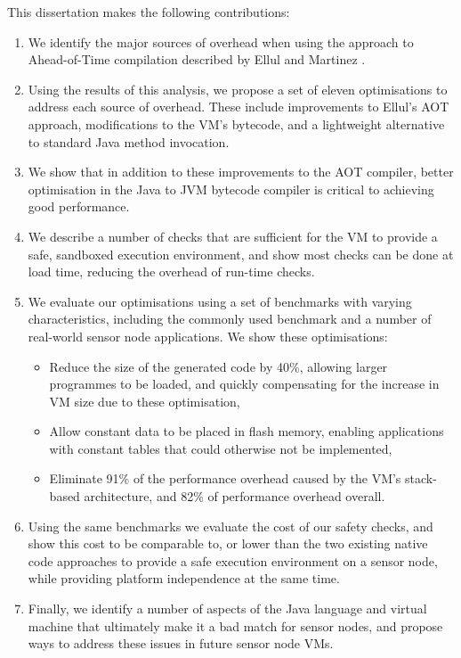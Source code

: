 \noindent
This dissertation makes the following contributions:
\begin{enumerate}
    \item We identify the major sources of overhead when using the approach to Ahead-of-Time compilation described by Ellul and Martinez \cite{Ellul:2010iw, Ellul:2012thesis}.
    \item Using the results of this analysis, we propose a set of eleven optimisations to address each source of overhead. These include improvements to Ellul's AOT approach, modifications to the VM's bytecode, and a lightweight alternative to standard Java method invocation.    
    \item We show that in addition to these improvements to the AOT compiler, better optimisation in the Java to JVM bytecode compiler is critical to achieving good performance.
    \item We describe a number of checks that are sufficient for the VM to provide a safe, sandboxed execution environment, and show most checks can be done at load time, reducing the overhead of run-time checks.
    \item We evaluate our optimisations using a set of benchmarks with varying characteristics, including the commonly used  benchmark \cite{coremark} and a number of real-world sensor node applications. We show these optimisations:
    \begin{itemize}
    	\item Reduce the size of the generated code by 40\%, allowing larger programmes to be loaded, and quickly compensating for the increase in VM size due to these optimisation, 
    	\item Allow constant data to be placed in flash memory, enabling applications with constant tables that could otherwise not be implemented,
    	\item Eliminate 91\% of the performance overhead caused by the VM's stack-based architecture, and 82\% of performance overhead overall.
    \end{itemize}
    \item Using the same benchmarks we evaluate the cost of our safety checks, and show this cost to be comparable to, or lower than the two existing native code approaches to provide a safe execution environment on a sensor node, while providing platform independence at the same time.
    \item Finally, we identify a number of aspects of the Java language and virtual machine that ultimately make it a bad match for sensor nodes, and propose ways to address these issues in future sensor node VMs.
\end{enumerate}

